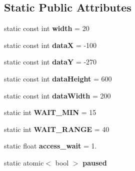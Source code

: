 \subsection*{Static Public Attributes}
\begin{DoxyCompactItemize}
\item 
\mbox{\label{class_r_w_thread_a341f51c32705a4a512e290aafffd2d14}} 
static const int {\bfseries width} = 20
\item 
\mbox{\label{class_r_w_thread_a7839c1805f22372e67752cdee6a6663d}} 
static const int {\bfseries dataX} = -\/100
\item 
\mbox{\label{class_r_w_thread_a63c00a2e076956ed629012f43d9b4d31}} 
static const int {\bfseries dataY} = -\/270
\item 
\mbox{\label{class_r_w_thread_a4aa23bfbc63fdce50643f6a01aa4e106}} 
static const int {\bfseries data\+Height} = 600
\item 
\mbox{\label{class_r_w_thread_afbb80d77d6834f770220e8c6cea25f10}} 
static const int {\bfseries data\+Width} = 200
\item 
\mbox{\label{class_r_w_thread_ab5e087e0b95345616711ea03d8aa89cb}} 
static int {\bfseries W\+A\+I\+T\+\_\+\+M\+IN} = 15
\item 
\mbox{\label{class_r_w_thread_a4b9b080b1e9a899e7173dadb9e915d2d}} 
static int {\bfseries W\+A\+I\+T\+\_\+\+R\+A\+N\+GE} = 40
\item 
\mbox{\label{class_r_w_thread_aa2b4739d82f6242c718db5cfe8af064f}} 
static float {\bfseries access\+\_\+wait} = 1.
\item 
\mbox{\label{class_r_w_thread_acf3c32cba39bd8a59f129cb6b41d62b9}} 
static atomic$<$ bool $>$ {\bfseries paused}
\end{DoxyCompactItemize}
